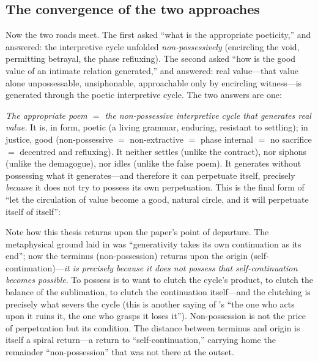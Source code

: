 \subsection{The convergence of the two approaches}
\label{p09:sec:convergence}

Now the two roads meet. The first asked ``what is the appropriate poeticity,'' and answered: the interpretive cycle unfolded \emph{non-possessively} (encircling the void, permitting betrayal, the phase refluxing). The second asked ``how is the good value of an intimate relation generated,'' and answered: real value---that value alone unpossessable, unsiphonable, approachable only by encircling witness---is generated through the poetic interpretive cycle. The two answers are one:

\begin{claim}
\emph{The appropriate poem $=$ the non-possessive interpretive cycle that generates real value.} It is, in form, poetic (a living grammar, enduring, resistant to settling); in justice, good (non-possessive $=$ non-extractive $=$ phase internal $=$ no sacrifice $=$ decentred and refluxing). It neither settles (unlike the contract), nor siphons (unlike the demagogue), nor idles (unlike the false poem). It generates without possessing what it generates---and therefore it can perpetuate itself, precisely \emph{because} it does not try to possess its own perpetuation. This is the final form of ``let the circulation of value become a good, natural circle, and it will perpetuate itself of itself'': 
\end{claim}

Note how this thesis returns upon the paper's point of departure. The metaphysical ground laid in  was ``generativity takes its own continuation as its end''; now the terminus (non-possession) returns upon the origin (self-continuation)---\emph{it is precisely because it does not possess that self-continuation becomes possible}. To possess is to want to clutch the cycle's product, to clutch the balance of the sublimation, to clutch the continuation itself---and the clutching is precisely what severs the cycle (this is another saying of 's ``the one who acts upon it ruins it, the one who grasps it loses it''). Non-possession is not the price of perpetuation but its condition. The distance between terminus and origin is itself a spiral return---a return to ``self-continuation,'' carrying home the remainder ``non-possession'' that was not there at the outset. 


